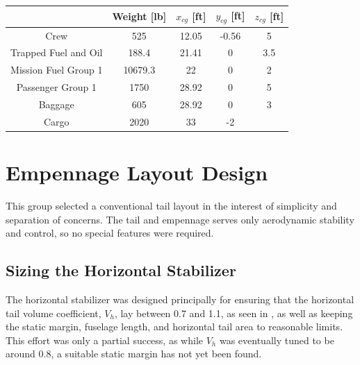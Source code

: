 \documentclass[conf]{new-aiaa}
\begin{document}
\begin{table}[H]
\centering
\label{tab:weight and cg fully loaded}
\begin{tabular}{|c|c|c|c|c|}\hline
						& Weight [lb] & $x_{cg}$ [ft] & $y_{cg}$ [ft] & $z_{cg}$ [ft]\\ \hline
Crew 					& 525 & 12.05 & -0.56 & 5\\ \hline
Trapped Fuel and Oil 	& 188.4 & 21.41 & 0 & 3.5\\ \hline
Mission Fuel Group 1 	& 10679.3 & 22 & 0 & 2\\ \hline
Passenger Group 1 		& 1750 & 28.92 & 0 & 5\\ \hline
Baggage 				& 605 & 28.92 & 0 & 3\\ \hline
Cargo 					& 2020 & 33 & -2\\ \hline

\end{tabular}

\end{table}


\section{Empennage Layout Design}

This group selected a conventional tail layout in the interest of simplicity and separation of concerns. The tail and empennage serves only aerodynamic stability and control, so no special features were required.

\subsection{Sizing the Horizontal Stabilizer} %

The horizontal stabilizer was designed principally for ensuring that the 
horizontal tail volume coefficient, $V_h$, lay between 0.7 and 1.1, as seen 
in \cite{orange_book}, as well as keeping the static margin, fuselage length, 
and horizontal tail area to reasonable limits. This effort was only a 
partial success, as while $V_h$ was eventually tuned to be around 0.8, a 
suitable static margin has not yet been found. 
\end{document}
